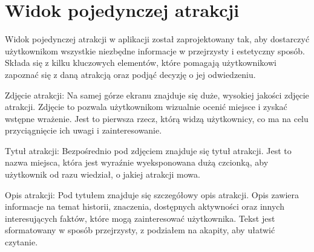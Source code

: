 \section{Widok pojedynczej atrakcji}
\label{sec:atrakcjawidok}
Widok pojedynczej atrakcji w aplikacji został zaprojektowany tak, aby dostarczyć 
użytkownikom wszystkie niezbędne informacje w przejrzysty i estetyczny sposób. 
Składa się z kilku kluczowych elementów, które pomagają użytkownikowi zapoznać się z daną atrakcją oraz podjąć decyzję o jej odwiedzeniu.

Zdjęcie atrakcji:
Na samej górze ekranu znajduje się duże, wysokiej jakości zdjęcie atrakcji. 
Zdjęcie to pozwala użytkownikom wizualnie ocenić miejsce i zyskać wstępne wrażenie. Jest to pierwsza rzecz, którą widzą użytkownicy, co ma na celu przyciągnięcie ich uwagi i zainteresowanie.

Tytuł atrakcji:
Bezpośrednio pod zdjęciem znajduje się tytuł atrakcji. Jest to nazwa miejsca, która jest 
wyraźnie wyeksponowana dużą czcionką, aby użytkownik od razu wiedział, o jakiej atrakcji mowa.

Opis atrakcji:
Pod tytułem znajduje się szczegółowy opis atrakcji. 
Opis zawiera informacje na temat historii, znaczenia, dostępnych aktywności oraz innych interesujących faktów, które mogą 
zainteresować użytkownika. Tekst jest sformatowany w sposób przejrzysty, z podziałem na akapity, aby ułatwić czytanie.

